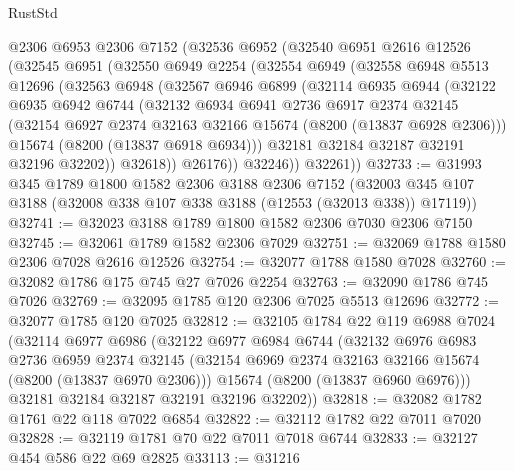 \begin{lexlean}{RustStd}
\begin{coremodule}
    @2306
    @6953
    @2306
    @7152
    (@32536
      @6952
      (@32540
        @6951
        @2616
        @12526
        (@32545
          @6951
          (@32550
            @6949
            @2254
            (@32554
              @6949
              (@32558
                @6948
                @5513
                @12696
                (@32563
                  @6948
                  (@32567
                    @6946
                    @6899
                    (@32114
                      @6935
                      @6944
                      (@32122
                        @6935
                        @6942
                        @6744
                        (@32132
                          @6934
                          @6941
                          @2736
                          @6917
                          @2374
                          @32145
                          (@32154 @6927 @2374 @32163 @32166 @15674 (@8200 (@13837 @6928 @2306)))
                          @15674
                          (@8200 (@13837 @6918 @6934)))
                        @32181
                        @32184
                        @32187
                        @32191
                        @32196
                        @32202))
                    @32618))
                @26176))
            @32246))
        @32261))
@32733 := @31993
    @345
    @1789
    @1800
    @1582
    @2306
    @3188
    @2306
    @7152
    (@32003 @345 @107 @3188 (@32008 @338 @107 @338 @3188 (@12553 (@32013 @338)) @17119))
@32741 := @32023 @3188 @1789 @1800 @1582 @2306 @7030 @2306 @7150
@32745 := @32061 @1789 @1582 @2306 @7029
@32751 := @32069 @1788 @1580 @2306 @7028 @2616 @12526
@32754 := @32077 @1788 @1580 @7028
@32760 := @32082 @1786 @175 @745 @27 @7026 @2254
@32763 := @32090 @1786 @745 @7026
@32769 := @32095 @1785 @120 @2306 @7025 @5513 @12696
@32772 := @32077 @1785 @120 @7025
@32812 := @32105
    @1784
    @22
    @119
    @6988
    @7024
    (@32114
      @6977
      @6986
      (@32122
        @6977
        @6984
        @6744
        (@32132
          @6976
          @6983
          @2736
          @6959
          @2374
          @32145
          (@32154 @6969 @2374 @32163 @32166 @15674 (@8200 (@13837 @6970 @2306)))
          @15674
          (@8200 (@13837 @6960 @6976)))
        @32181
        @32184
        @32187
        @32191
        @32196
        @32202))
@32818 := @32082 @1782 @1761 @22 @118 @7022 @6854
@32822 := @32112 @1782 @22 @7011 @7020
@32828 := @32119 @1781 @70 @22 @7011 @7018 @6744
@32833 := @32127 @454 @586 @22 @69 @2825
@33113 := @31216

\end{coremodule}
\end{lexlean}
